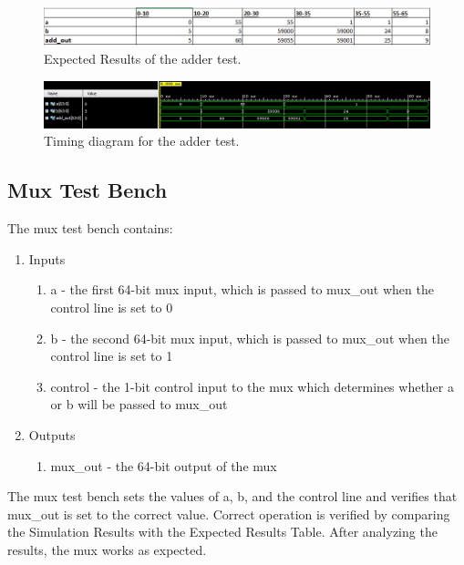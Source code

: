 \documentclass{article}
\begin{document}
\begin{figure}
	\begin{center}
		\caption{Expected Results of the adder test.}\label{fig:ert_addertest}
		\includegraphics[width=1.0\textwidth]{../images/ert_adder_test.png}
	\end{center}
\end{figure}

\begin{figure}
	\begin{center}
		\caption{Timing diagram for the adder test.}\label{fig:addertest}
		\includegraphics[width=1.0\textwidth]{../images/adder_test.png}
	\end{center}
\end{figure}

\subsection{Mux Test Bench}
The mux test bench contains:
\begin{enumerate}
	\item Inputs
	\begin{enumerate}
		\item a - the first 64-bit mux input, which is passed to mux\_out when the control line is set to 0 
		\item b - the second 64-bit mux input, which is passed to mux\_out when the control line is set to 1
		\item control - the 1-bit control input to the mux which determines whether a or b will be passed to mux\_out
	\end{enumerate}	
	\item Outputs
	\begin{enumerate}	
		\item mux\_out - the 64-bit output of the mux
	\end{enumerate}
\end{enumerate} 

The mux test bench sets the values of a, b, and the control line and verifies that mux\_out is set to the correct value.  Correct operation is verified by comparing the Simulation Results with the Expected Results Table.  After analyzing the results, the mux works as expected.
\end{document}

